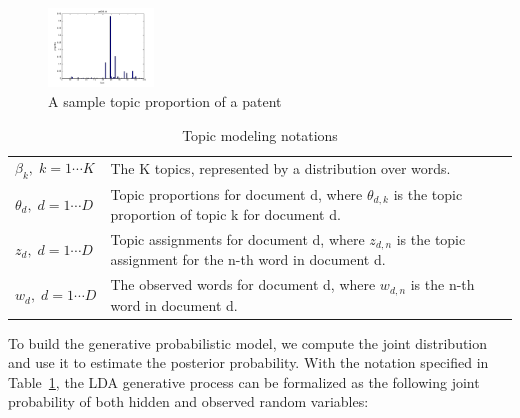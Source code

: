 \documentclass[conference]{IEEEtran}
\begin{document}
\begin{figure}[h]
	\center
	\includegraphics[width=0.25\textwidth]{fig/pat8_topics.png}
	\caption{A sample topic proportion of a patent}
	\label{topic_proportion}
\end{figure}




\begin{table}[h]
	\center
	\begin{tabular}{l p{5.5cm}}
$\beta_k,\; k = 1 \cdots K$& The K topics, represented by a distribution over words.\\
$\theta_d,\; d = 1 \cdots D$& Topic proportions for document d, where $\theta_{d,k}$ is the topic proportion of topic k for document d.\\
$z_d,\; d = 1 \cdots D$& Topic assignments for document d, where $z_{d,n}$ is the topic assignment for the n-th word in document d.\\
$w_d,\; d = 1 \cdots D$& The observed words for document d, where $w_{d,n}$ is the n-th word in document d.\\
	\end{tabular}
	\caption{Topic modeling notations}
	\label{tm_notations}
\end{table}
	
%
To build the generative probabilistic model, we compute the joint distribution and use it to estimate the posterior probability. With the notation specified in Table~\ref{tm_notations}, the LDA generative process can be formalized as the following joint probability of both hidden and observed random variables:
\end{document}
